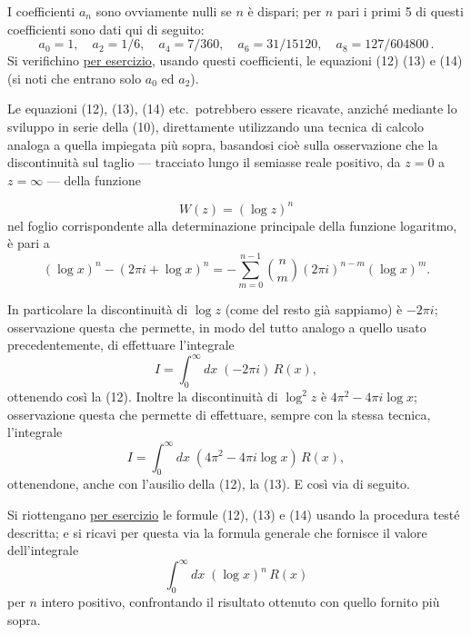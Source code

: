 \documentclass[11pt, a4paper]{book}
\numberwithin{equation}{section}
\begin{document}
I coefficienti $a_n$ sono ovviamente nulli se $n$ è dispari; per $n$ pari
i primi 5 di questi coefficienti sono dati qui di seguito:
\[
    a_0 = 1,\quad a_2 = 1/6,\quad a_4 = 7/360,\quad a_6 = 31/15120,\quad
    a_8 = 127/604800\,.
\]
Si verifichino \uline{per esercizio}, usando questi coefficienti, le equazioni
(12) (13) e (14) (si noti che entrano solo $a_0$ ed $a_2$).

\medskip
Le equazioni (12), (13), (14) etc.\ potrebbero essere ricavate, anziché
mediante lo sviluppo in serie della (10), direttamente utilizzando una tecnica
di calcolo analoga a quella impiegata più sopra, basandosi cioè sulla osservazione
che la discontinuità sul taglio --- tracciato lungo il semiasse reale positivo,
da $z=0$ a $z=\infty$ --- della funzione


\begin{equation}
    W(z) = \left(\log z\right)^n \tag{15}
\end{equation}
nel foglio corrispondente alla determinazione principale della funzione logaritmo,
è pari a
\begin{equation}
    (\log x)^n - (2\pi i + \log x)^n
    = -\sum_{m=0}^{n-1} \binom{n}{m} (2\pi i)^{n-m} (\log x)^m. \tag{16}
\end{equation}

In particolare la discontinuità di $\log z$ (come del resto già sappiamo)
è $-2\pi i$; osservazione questa che permette, in modo del tutto analogo a
quello usato precedentemente, di effettuare l'integrale
\begin{equation}
    I = \int_0^\infty dx\; (-2\pi i)\, R(x), \tag{17}
\end{equation}
ottenendo così la (12). Inoltre la discontinuità di $\log^2 z$ è
$4\pi^2 - 4\pi i \log x$; osservazione questa che permette di effettuare,
sempre con la stessa tecnica, l'integrale
\begin{equation}
    I = \int_0^\infty dx\; (4\pi^2 - 4\pi i \log x)\, R(x), \tag{18}
\end{equation}
ottenendone, anche con l'ausilio della (12), la (13). E così via di seguito.

\medskip
Si riottengano \uline{per esercizio} le formule (12), (13) e (14) usando la
procedura testé descritta; e si ricavi per questa via la formula generale che
fornisce il valore dell'integrale
\[
    \int_0^\infty dx\; (\log x)^n\, R(x)
\]
per $n$ intero positivo, confrontando il risultato ottenuto con quello fornito
più sopra.
\end{document}
